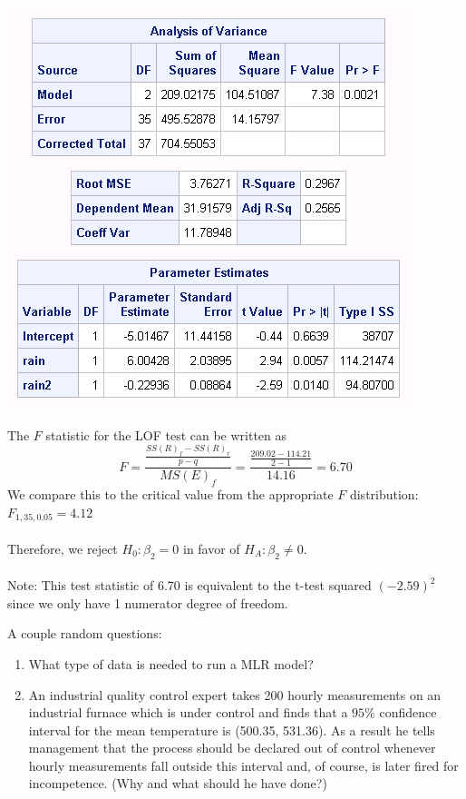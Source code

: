 \documentclass{report}
\begin{document}
\begin{center}
\includegraphics[scale=0.7]{cornquadratic}
\end{center}

The $F$ statistic for the LOF test can be written as
$$F=\frac{\frac{SS(R)_f-SS(R)_r}{p-q}}{MS(E)_f}=\frac{\frac{209.02-114.21}{2-1}}{14.16}=6.70$$
We compare this to the critical value from the appropriate $F$ distribution: $F_{1,35,0.05}=4.12$\\~\\
Therefore, we reject $H_0:\beta_2=0$ in favor of $H_A:\beta_2\ne0$.\\~\\
Note: This test statistic of 6.70 is equivalent to the t-test squared $(-2.59)^2$ since we only have 1 numerator degree of freedom.

\newpage

A couple random questions:
\begin{enumerate}
\item What type of data is needed to run a MLR model?
\item An industrial quality control expert takes 200 hourly measurements on an industrial furnace which is under control and finds that a $95\%$ confidence interval for the mean temperature is (500.35, 531.36). As a result he tells management that the process should be declared out of control whenever hourly measurements fall outside this interval and, of course, is later fired for incompetence. (Why and what should he have done?)
\end{enumerate}
\end{document}
